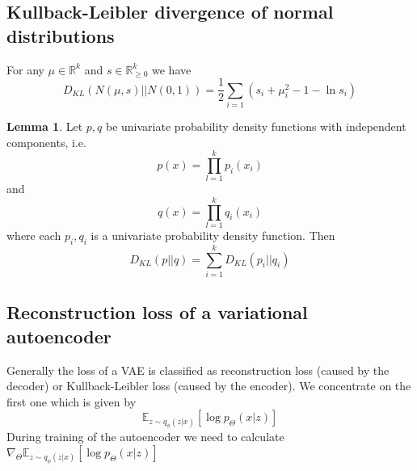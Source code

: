 \documentclass[a4paper, 12pt]{article}
\theoremstyle{plain}
\theoremstyle{definition}
\theoremstyle{lemma}
\newtheorem{lemma}[theorem]{Lemma}
\theoremstyle{remark}
\theoremstyle{example}
\begin{document}
	\subsection{Kullback-Leibler divergence of normal distributions}
	For any $\mu \in \mathbb{R}^k$ and $s \in \mathbb{R}^k_{\geq 0}$ we have \[D_{KL}(N(\mu,s)||N(0,1)) = \frac{1}{2} \sum_{i=1} (s_i + \mu_i^2 - 1 - \ln s_i)\]
	\begin{lemma}
		Let $p,q$ be univariate probability density functions with independent components, i.e. \[p(x) = \prod_{l=1}^k p_i(x_i)\] and \[q(x) = \prod_{l=1}^k q_i(x_i)\] where each $p_i,q_i$ is a univariate probability density function. Then \[D_{KL}(p||q) = \sum_{i=1}^k D_{KL}(p_i||q_i)\]
	\end{lemma}
	\subsection{Reconstruction loss of a variational autoencoder}
	Generally the loss of a VAE is classified as reconstruction loss (caused by the decoder) or Kullback-Leibler loss (caused by the encoder). We concentrate on the first one which is given by \[\mathbb{E}_{z \sim q_\phi(z|x)} [\log p_\Theta(x|z)]\]
	During training of the autoencoder we need to calculate $\nabla_\Theta \mathbb{E}_{z \sim q_\phi(z|x)} [\log p_\Theta(x|z)]$ 
\end{document}
